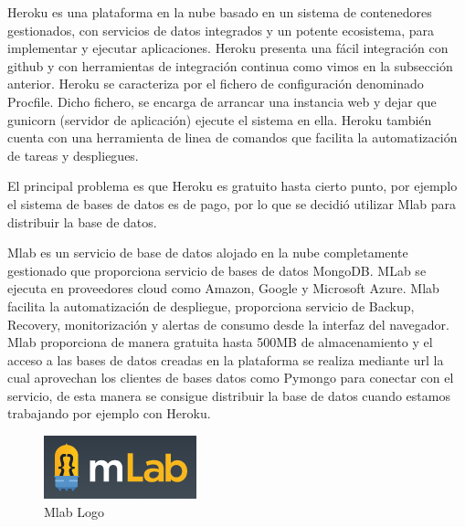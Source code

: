 \documentclass[a4paper,11pt]{book}
\begin{document}
Heroku es una plataforma en la nube basado en un sistema de contenedores gestionados, con servicios de datos integrados y un potente ecosistema, para implementar y ejecutar aplicaciones. Heroku presenta una fácil integración con github y con herramientas de integración continua como vimos en la subsección anterior. Heroku se caracteriza por el fichero de configuración denominado Procfile. Dicho fichero, se encarga de arrancar una instancia web y dejar que gunicorn (servidor de aplicación) ejecute el sistema en ella. Heroku también cuenta con una herramienta de linea de comandos que facilita la automatización de tareas y despliegues. 

El principal problema es que Heroku es gratuito hasta cierto punto, por ejemplo el sistema de bases de datos es de pago, por lo que se decidió utilizar Mlab para distribuir la base de datos.

Mlab\cite{mlab} es un servicio de base de datos alojado en la nube completamente gestionado que proporciona servicio de bases de datos MongoDB. MLab se ejecuta en proveedores cloud como Amazon, Google y Microsoft Azure. Mlab facilita la automatización de despliegue, proporciona servicio de Backup, Recovery, monitorización y alertas de consumo desde la interfaz del navegador. Mlab proporciona de manera gratuita hasta 500MB de almacenamiento y el acceso a las bases de datos creadas en la plataforma se realiza mediante url la cual aprovechan los clientes de bases datos como Pymongo para conectar con el servicio, de esta manera se consigue distribuir la base de datos cuando estamos trabajando por ejemplo con Heroku. 

\begin{figure}[H] 
\centering 
\includegraphics[scale=0.50]{imagenes/desarrollo_herramienta/mlab.png}
\caption{ Mlab Logo\cite{mlabL}  }  
\end{figure} 
  
\end{document}
